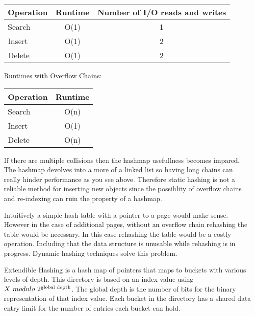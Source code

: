 \documentclass[letterpaper, 12pt]{article}
\begin{document}
\begin{center}
\begin{tabular}{l | c | c}
  \hline
  Operation & Runtime & Number of I/O reads and writes \\ \hline \hline
  Search & O(1) & 1  \\ \hline
  Insert & O(1) & 2  \\ \hline
  Delete & O(1) & 2  \\ \hline
\end{tabular}
\end{center}

\par\vspace{\baselineskip}

Runtimes with Overflow Chains:
\par\vspace{\baselineskip}
\begin{center}
\begin{tabular}{l | c}
  \hline
  Operation & Runtime \\ \hline \hline
  Search & O(n) \\ \hline
  Insert & O(1) \\ \hline
  Delete & O(n) \\ \hline
\end{tabular}
\end{center}

If there are multiple collisions then the hashmap usefullness becomes impared. The hashmap devolves into a more
of a linked list so having long chains can really hinder performance as you see above. Therefore static hashing
is not a reliable method for inserting new objects since the possiblity of overflow chains and re-indexing can
ruin the property of a hashmap.
\par\vspace{\baselineskip}

Intuitively a simple hash table with a pointer to a page would make sense. However in the case of
additional pages, without an overflow chain rehashing the table would be necessary. In this
case rehashing the table would be a costly operation. Including that the data structure is unusable
while rehashing is in progress. Dynamic hashing techniques solve this problem.
\par\vspace{\baselineskip}

Extendible Hashing is a hash map of pointers that maps to buckets with various levels of depth. This directory
is based on an index value using $ X\ modulo\ 2\textsuperscript{global depth} $. The global depth is the number of bits for the binary
representation of that index value. Each bucket in the directory has a shared data entry limit for the number of
entries each bucket can hold.
\end{document}
